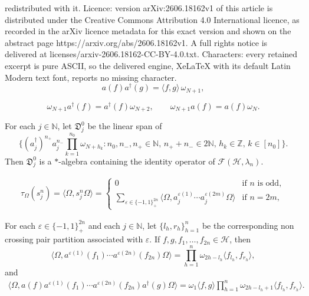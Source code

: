 \documentclass[10pt,a4paper]{amsart}
\newcommand{\cf}{cf.\ }
\def\Om{\Omega}
\def\bn{{\mathbb N}}
\def\bz{{\mathbb Z}}
\def\cf{{\mathcal F}}
\def\ch{{\mathcal H}}
\def\eps{\varepsilon}
\def\gd{{\mathfrak D}}
\def\l{\lambda} \def\L{\Lambda}
\def\om{\omega} \def\Om{\Omega}
\def\t{\tau}
\begin{document}
redistributed with it. Licence: version arXiv:2606.18162v1 of this article is distributed under the Creative Commons Attribution 4.0 International licence, as recorded in the arXiv licence metadata for this exact version and shown on the abstract page https://arxiv.org/abs/2606.18162v1. A full rights notice is delivered at licenses/arxiv-2606.18162-CC-BY-4.0.txt. Characters: every retained excerpt is pure ASCII, so the delivered engine, XeLaTeX with its default Latin Modern text font, reports no missing character.
\begin{equation}
\label{cr}
a(f) a^{\dag} (g) = \langle f, g\rangle\,\om_{N+1},
\end{equation}

\begin{equation}
\label{cr2}
\om_{N+1} a^\dag(f) = a^\dag(f) \om_{N+2}, \qquad
\om_{N+1} a(f) = a(f) \om_N .
\end{equation}

\begin{prop}\label{free1}
For each $j\in\bn$, let $\gd^0_j$ be the linear span of
$$
\bigg\{(a_j^\dag)^{n_+}a_j^{n_-}\prod_{k=1}^{n_0}\om_{N+h_k} :n_0,n_-,n_+\in\bn,\, n_++n_-\in 2\bn,\, h_k\in\bz,\, k\in [n_0]\bigg\}.
$$
Then $\gd^0_j$ is a $*$-algebra containing the identity operator of $\cf(\ch,\l_n)$.
\end{prop}

\begin{align}
\label{2ome01b}
\t_\Om(s_j^n)=\langle\Omega,s_j^n\Omega\rangle
=
\begin{cases}
0 & \text{if $n$ is odd},\\
\displaystyle
\sum_{\eps\in\{-1,1\}^{2n}_+}
\langle\Omega,
a_j^{\eps(1)}\cdots a_j^{\eps(2m)}\Omega\rangle
& \text{if $n=2m$},
\end{cases}
\end{align}

\begin{prop}
\label{moment1}
For each $\eps\in\{-1,1\}^{2n}_+$ and each $j\in\bn$, let $\{l_h,r_h\}_{h=1}^n$ be the corresponding non crossing pair partition associated with $\eps$. If $f,g,f_1,\ldots, f_{2n}\in\ch$, then
\begin{equation}
\label{2ome02a}
\langle\Omega,
a^{\eps(1)}(f_1)\cdots a^{\eps(2n)}(f_{2n})\Omega\rangle
=
\prod_{h=1}^n \om_{2h-l_h}\langle f_{l_h},f_{r_h}\rangle,
\end{equation}
and
\begin{align}
\label{2ome02b}
\langle\Omega,
a(f) a^{\eps(1)}(f_1)\cdots a^{\eps(2n)}(f_{2n}) a^\dag(g) \Omega\rangle
=
\om_1\langle f,g\rangle \prod_{h=1}^n \om_{2h-l_h+1}\langle f_{l_h},f_{r_h}\rangle.
\end{align}
\end{prop}
\end{document}
